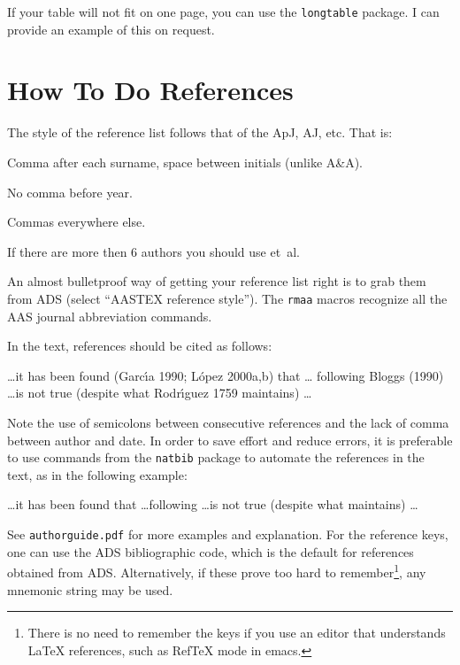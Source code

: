 \documentclass[proceedings, preprint]{rmaa}
\newenvironment{Example}
{\begin{list}{}{\setlength{\leftmargin}{5pt}\setlength{\rightmargin}{5pt}}\item[]}
  {\end{list}}
\begin{document}
If your table will not fit on one page, you can use the \texttt{longtable}
package. I can provide an example of this on request. 

\section{How To Do References}
\label{sec:refs}

The style of the reference list follows that of the ApJ, AJ, etc. That
is:
\begin{compactitem}
\item Comma after each surname, space between initials (unlike A\&A).
\item No comma before year.
\item Commas everywhere else. 
\item If there are more then 6 authors you should use et~al.
\end{compactitem}
An almost bulletproof way of getting your reference list right is to
grab them from ADS (select ``AASTEX reference style''). The
\texttt{rmaa} macros recognize all the AAS journal abbreviation
commands. 

In the text, references should be cited as follows: 
\begin{Example}
  \dots it has been found (Garc\'\i{}a 1990; L\'opez 2000a,b) that \dots
  following Bloggs (1990) \dots is not true (despite what
  Rodr\'\i{}guez 1759 maintains) \dots
\end{Example}
Note the use of semicolons between consecutive references and the lack
of comma between author and date. In order to save effort and reduce
errors, it is preferable to use commands from the \texttt{natbib}
package to automate the references in the text, as in the following
example:
\begin{Example}
  \dots it has been found \citep{2005astro.ph.11035A,
    1991ApJ...374..580B, 2005MNRAS.358..291D} that \dots following
  \citet{1996ApJ...469..171G} \dots is not true (despite what
  \citealp{1939ApJ....89..526S} maintains) \dots
\end{Example}
See \texttt{authorguide.pdf} for more examples and explanation.  For
the reference keys, one can use the ADS bibliographic code, which is
the default for references obtained from ADS. Alternatively, if these
prove too hard to remember\footnote{There is no need to remember the
  keys if you use an editor that understands \LaTeX{} references, such
  as RefTeX mode in emacs.}, any mnemonic string may be used.
\end{document}
